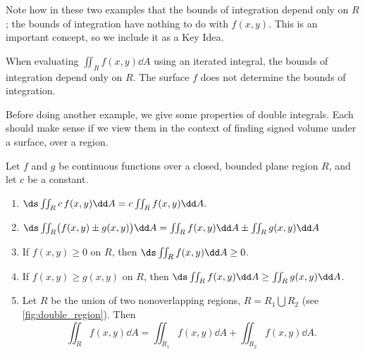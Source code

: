 Note how in these two examples that the bounds of integration depend only on $R$; the bounds of integration have nothing to do with $f(x,y)$. This is an important concept, so we include it  as a Key Idea.

\begin{keyidea}\label{idea:bounds_on_double}
When evaluating $\iint_Rf(x,y)\dd A$ using an iterated integral, the bounds of integration depend only on $R$. The surface $f$ does not determine the bounds of integration.
\end{keyidea}

Before doing another example, we give some properties of double integrals. Each should make sense if we view them in the context of finding signed volume under a surface, over a region.

\begin{theorem}\label{thm:double_prop}
Let $f$ and $g$ be continuous functions over a closed, bounded plane region $R$, and let $c$ be a constant.
\begin{enumerate}
	\item $\ds \iint_Rc\,f(x,y)\dd A = c\iint_Rf(x,y)\dd A.$
	\item	$\ds \iint_R \bigl(f(x,y)\pm g(x,y)\bigr)\dd A = \iint_R f(x,y)\dd A \pm \iint_R g(x,y)\dd A $
	\item	If $f(x,y)\geq 0$ on $R$, then $\ds \iint_R f(x,y)\dd A\geq 0$.
	\item	If $f(x,y)\geq g(x,y)$ on $R$, then $\ds \iint_R f(x,y)\dd A\geq \iint_R g(x,y)\dd A$.
%
%
	\item \label{thm:double_prop_regions}	Let $R$ be the union of two nonoverlapping regions, $R = R_1\bigcup R_2$ (see \autoref{fig:double_region}). Then 
	\[\iint_R f(x,y)\dd A = \iint_{R_1}f(x,y)\dd A+ \iint_{R_2}f(x,y)\dd A.\]
\end{enumerate}
\end{theorem}

